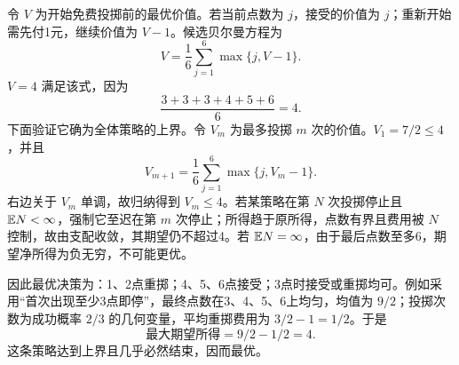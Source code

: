 令 $V$ 为开始免费投掷前的最优价值。若当前点数为 $j$，接受的价值为 $j$；重新开始需先付1元，继续价值为 $V-1$。候选贝尔曼方程为
\[
 V=\frac16\sum_{j=1}^6\max\{j,V-1\}.
\]
$V=4$ 满足该式，因为
\[
 \frac{3+3+3+4+5+6}{6}=4.
\]
下面验证它确为全体策略的上界。令 $V_m$ 为最多投掷 $m$ 次的价值。$V_1=7/2\le4$，并且
\[
 V_{m+1}=\frac16\sum_{j=1}^6\max\{j,V_m-1\}.
\]
右边关于 $V_m$ 单调，故归纳得到 $V_m\le4$。若某策略在第 $N$ 次投掷停止且 $\mathbb{E} N<\infty$，强制它至迟在第 $m$ 次停止；所得趋于原所得，点数有界且费用被 $N$ 控制，故由支配收敛，其期望仍不超过4。若 $\mathbb{E} N=\infty$，由于最后点数至多6，期望净所得为负无穷，不可能更优。

因此最优决策为：1、2点重掷；4、5、6点接受；3点时接受或重掷均可。例如采用“首次出现至少3点即停”，最终点数在3、4、5、6上均匀，均值为 $9/2$；投掷次数为成功概率 $2/3$ 的几何变量，平均重掷费用为 $3/2-1=1/2$。于是
\[
 \boxed{\text{最大期望所得}=9/2-1/2=4}.
\]
这条策略达到上界且几乎必然结束，因而最优。

